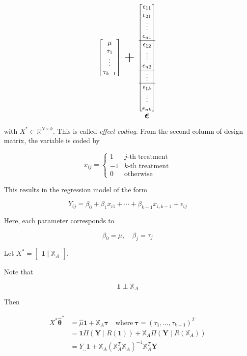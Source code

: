 \documentclass[]{book}
\newcommand{\E}{\boldsymbol\epsilon}
\theoremstyle{definition}
\theoremstyle{definition}
\theoremstyle{definition}
\theoremstyle{remark}
\begin{document}
\[{\begin{bmatrix}
  \mu \\
  \tau_1 \\
  \vdots \\
  \tau_{k - 1}
\end{bmatrix}} + \underset{\huge \E}{\begin{bmatrix}
  \epsilon_{11} \\
  \epsilon_{21} \\
  \vdots \\
  \epsilon_{n1} \\ \hline
  \epsilon_{12} \\
  \vdots \\
  \epsilon_{n2} \\ \hline
  \vdots \\ \hline
  \epsilon_{1k} \\
  \vdots \\
  \epsilon_{nk}
\end{bmatrix}}
\]

with \(X^{\ast} \in \mathbb{R}^{N \times k}\). This is called \emph{effect coding}. From the second column of design matrix, the variable is coded by

\[
x_{ij} = \begin{cases}
  1 & j\text{-th treatment} \\
  -1 & k\text{-th treatment} \\
  0 & \text{otherwise}
\end{cases}
\]

This results in the regression model of the form

\[Y_{ij} = \beta_0 + \beta_1 x_{i1} + \cdots + \beta_{k - 1} x_{i, k - 1} + \epsilon_{ij}\]

Here, each parameter corresponds to

\[\beta_0 = \mu, \quad \beta_j = \tau_j\]

Let \(X^{\ast} = \begin{bmatrix} \mathbf{1} \mid \mathbb{X}_A \end{bmatrix}\).

Note that

\[\mathbf{1} \perp \mathbb{X}_A\]

Then

\begin{equation*}
  \begin{split}
    X^{\ast} \hat{\boldsymbol\theta}^{\ast} & = \hat\mu \mathbf{1} + \mathbb{X}_A \boldsymbol{\tau} \quad \text{where}\: \boldsymbol{\tau} = (\tau_1, \ldots, \tau_{k - 1})^T \\
    & = \mathbf{1} \Pi(\mathbf{Y} \mid R(\mathbf{1})) + \mathbb{X}_A \Pi(\mathbf{Y} \mid R(\mathbb{X}_A)) \\
    & = \overline{Y}_{..}\mathbf{1} + \mathbb{X}_A (\mathbb{X}_A^T \mathbb{X}_A)^{-1} \mathbb{X}_A^T \mathbf{Y}
  \end{split}
\end{equation*}
\end{document}
